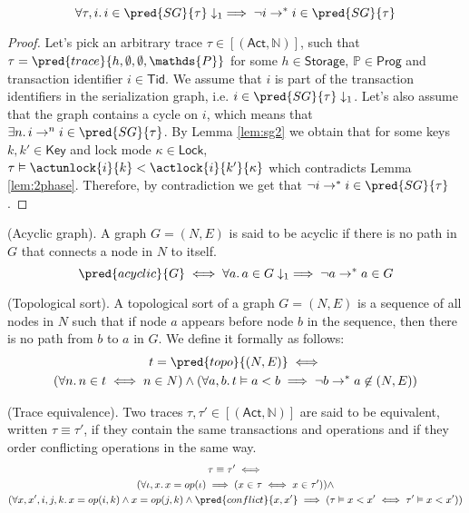 \thm \label{thm:sgAcyclic}
\[
\forall \tau, i \ldotp i \in \pred{SG}{\tau} \downarrow_1 \implies \lnot i \rightarrow^* i \in \pred{SG}{\tau}
\]

\begin{proof}
Let's pick an arbitrary trace $\tau \in [(\mathsf{Act}, \mathds{N})]$, such that $\tau = \pred{trace}{h, \emptyset, \emptyset, \mathds{P}}$ for some $h \in \mathsf{Storage}$, $\mathds{P} \in \mathsf{Prog}$ and transaction identifier $i \in \mathsf{Tid}$. We assume that $i$ is part of the transaction identifiers in the serialization graph, i.e. $i \in \pred{SG}{\tau} \downarrow_1$. Let's also assume that the graph contains a cycle on $i$, which means that $\exists n \ldotp i \rightarrow^n i \in \pred{SG}{\tau}$. By Lemma \ref{lem:sg2} we obtain that for some keys $k, k' \in \mathsf{Key}$ and lock mode $\kappa \in \mathsf{Lock}$, $\tau \vDash \actunlock{i}{k} < \actlock{i}{k'}{\kappa}$ which contradicts Lemma \ref{lem:2phase}. Therefore, by contradiction we get that $\lnot i \rightarrow^* i \in \pred{SG}{\tau}$.
\end{proof}

 (Acyclic graph). A graph $G = (N, E)$ is said to be acyclic if there is no path in $G$ that connects a node in $N$ to itself.
\[
	\pred{acyclic}{G} \iff \forall a \ldotp a \in G \downarrow_1 \implies \lnot a \rightarrow^* a \in G
\]

 (Topological sort). A topological sort of a graph $G = (N, E)$ is a sequence of all nodes in $N$ such that if node $a$ appears before node $b$ in the sequence, then there is no path from $b$ to $a$ in $G$. We define it formally as follows:
\begin{gather*}
	t = \pred{topo}{(N, E)} \iff \\
	(\forall n \ldotp n \in t \iff n \in N) \land (\forall a, b \ldotp t \vDash a < b \implies \lnot b \rightarrow^* a \not\in (N, E))
\end{gather*}

 (Trace equivalence). Two traces $\tau, \tau' \in [(\mathsf{Act}, \mathds{N})]$ are said to be equivalent, written $\tau \equiv \tau'$, if they contain the same transactions and operations and if they order conflicting operations in the same way.
\begin{gather*}
	\tau \equiv \tau' \iff \\
	(\forall \iota, x \ldotp x = op(\iota) \implies (x \in \tau \iff x \in \tau')) \land \\
	(\forall x, x', i, j, k \ldotp x = op(i, k) \land x = op(j, k) \land \pred{conflict}{x, x'}
	\implies (\tau \vDash x < x' \iff \tau' \vDash x < x'))
\end{gather*}

